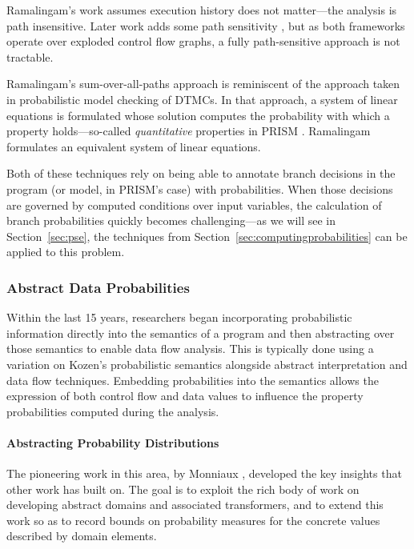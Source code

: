 Ramalingam's work assumes execution history does not 
matter---the analysis is path insensitive.
Later work adds some path sensitivity \cite{mehofer2001novel}, 
but as both frameworks operate over exploded control flow graphs, a fully 
path-sensitive approach is not tractable.

Ramalingam's sum-over-all-paths approach is reminiscent of
the approach taken in probabilistic model checking of DTMCs.
In that approach, a system of linear equations is formulated
whose solution computes the probability with which a property
holds---so-called \textit{quantitative} properties in 
PRISM \cite{kwiatkowska2010advances}.   Ramalingam formulates an
equivalent system of linear equations.  

Both of these techniques rely on being able to annotate
branch decisions in the program (or model, in PRISM's case)
with probabilities.  When those decisions are governed by
computed conditions over input variables, the calculation of
branch probabilities quickly becomes challenging---as we will
see in Section~\ref{sec:pse}, the techniques from 
Section~\ref{sec:computingprobabilities} can be applied to
this problem.


\subsubsection{Abstract Data Probabilities}
Within the last 15 years, researchers 
began incorporating probabilistic information directly into
the semantics of a program and then abstracting over 
those semantics 
\cite{monniaux2000abstract,smith2008probabilistic,cousot2012probabilistic}
to enable data flow analysis.
This is typically done using a variation on Kozen's 
probabilistic semantics \cite{kozen1981semantics} 
alongside abstract interpretation and data flow techniques.
Embedding probabilities into the semantics allows 
the expression of both control flow and data values to influence
the property probabilities computed during the analysis.

\paragraph{Abstracting Probability Distributions}
The pioneering work in this area, by 
Monniaux \cite{monniaux2000abstract,monniaux2001backwards},
developed the key insights that other work has built on. 
The goal is to exploit the rich body of work on developing
abstract domains and associated transformers, and to extend this work 
so as to record bounds on probability measures for the concrete values
described by domain elements.

